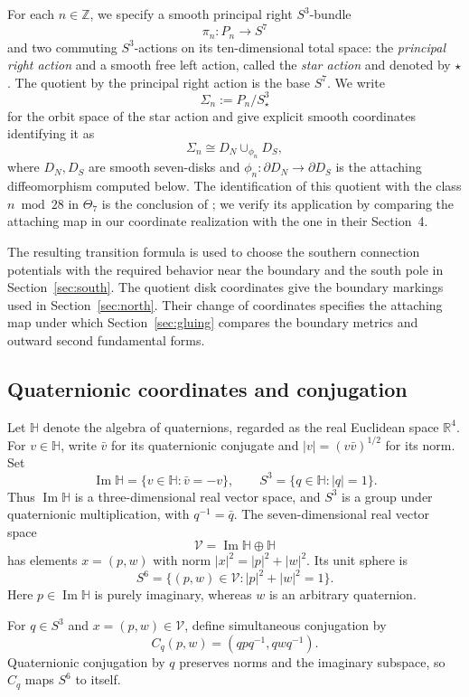 \documentclass[12pt]{amsart}
\numberwithin{equation}{section}
\theoremstyle{remark}
\newcommand{\Hh}{\mathbb H}
\newcommand{\Rr}{\mathbb R}
\begin{document}
For each \(n\in\mathbb Z\), we specify a smooth principal
right \(S^3\)-bundle
\[
 \pi_n:P_n\longrightarrow S^7
\]
and two commuting \(S^3\)-actions on its ten-dimensional total space:
the \emph{principal right action} and a smooth free left action,
called the \emph{star action} and denoted by \(\star\). The quotient
by the principal right action is the base \(S^7\). We write
\[
 \Sigma_n:=P_n/S^3_\star
\]
for the orbit space of the star action and give explicit smooth
coordinates identifying it as
\[
 \Sigma_n\cong D_N\cup_{\phi_n}D_S,
\]
where \(D_N,D_S\) are smooth seven-disks and
\(\phi_n:\partial D_N\to\partial D_S\) is the attaching
diffeomorphism computed below. The identification of this quotient
with the class \(n\bmod28\) in \(\Theta_7\) is the conclusion of
\cite[Theorem~1]{DPR}; we verify its application by comparing the
attaching map in our coordinate realization with the one in their Section~4.

The resulting transition formula is used to choose the southern connection potentials with the required behavior near the boundary and the south pole in Section~\ref{sec:south}. The quotient disk coordinates give the boundary markings used in Section~\ref{sec:north}. Their change of coordinates specifies the attaching map under which Section~\ref{sec:gluing} compares the boundary metrics and outward second fundamental forms.

\subsection{Quaternionic coordinates and conjugation}
Let \(\Hh\) denote the algebra of quaternions, regarded as the real
Euclidean space \(\Rr^4\). For \(v\in\Hh\), write \(\bar v\) for its
quaternionic conjugate and \(|v|=(v\bar v)^{1/2}\) for its norm. Set
\[
 \operatorname{Im}\Hh=\{v\in\Hh:\bar v=-v\},
 \qquad S^3=\{q\in\Hh:|q|=1\}.
\]
Thus \(\operatorname{Im}\Hh\) is a three-dimensional real vector
space, and \(S^3\) is a group under quaternionic multiplication, with
\(q^{-1}=\bar q\). The seven-dimensional real vector space
\[
 \mathcal V=\operatorname{Im}\Hh\oplus\Hh
\]
has elements \(x=(p,w)\) with norm
\(|x|^2=|p|^2+|w|^2\). Its unit sphere is
\[
 S^6=\{(p,w)\in\mathcal V:|p|^2+|w|^2=1\}.
\]
Here \(p \in \operatorname{Im}\Hh \) is purely imaginary, whereas \(w\) is an arbitrary
quaternion.

For \(q\in S^3\) and \(x=(p,w)\in\mathcal V\), define simultaneous conjugation by
\[
 C_q(p,w)=(qpq^{-1},qwq^{-1}).
\]
Quaternionic conjugation by \(q\) preserves norms and the imaginary
subspace, so \(C_q\) maps \(S^6\) to itself.
\end{document}
